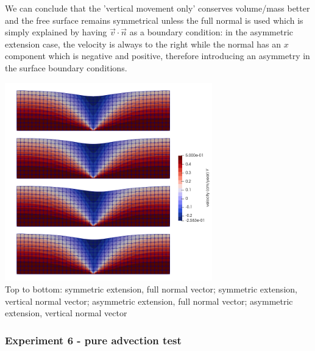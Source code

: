 We can conclude that the 'vertical movement only' conserves volume/mass better and the free surface remains symmetrical unless the full normal is used which is simply explained by having $\vec{v}\cdot\vec{n}$ as a boundary condition: in the asymmetric extension case, the velocity is always to the right while the normal has an $x$ component which is negative and positive, therefore introducing an asymmetry in the surface boundary conditions.

\begin{center}
\includegraphics[width=9cm]{python_codes/fieldstone_54/images/exp4-5/v}\\
{\captionfont Top to bottom: 
symmetric extension, full normal vector; 
symmetric extension, vertical normal vector; 
asymmetric extension, full normal vector; 
asymmetric extension, vertical normal vector}
\end{center}

\subsubsection*{Experiment 6 - pure advection test}

